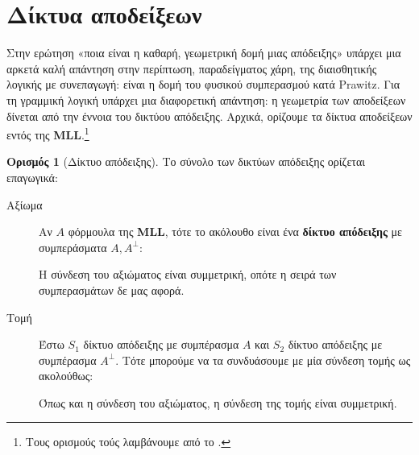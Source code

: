 \documentclass [a4paper,11pt] {book}
\theoremstyle{definition}
\theoremstyle{definition}
\newtheorem{definition}[theorem]{Ορισμός}
\begin{document}
\section{Δίκτυα αποδείξεων}
Στην ερώτηση «ποια είναι η καθαρή, γεωμετρική δομή μιας απόδειξης» υπάρχει μια αρκετά καλή απάντηση στην περίπτωση, παραδείγματος χάρη, της διαισθητικής λογικής με συνεπαγωγή: είναι η δομή του φυσικού συμπερασμού κατά Prawitz. Για τη γραμμική λογική υπάρχει μια διαφορετική απάντηση: η γεωμετρία των αποδείξεων δίνεται από την έννοια του δικτύου απόδειξης. Αρχικά, ορίζουμε τα δίκτυα αποδείξεων εντός της \textbf{MLL}.\footnote{Τους ορισμούς τούς λαμβάνουμε από το \citep{moot2002proof}.}
\begin{definition}[Δίκτυο απόδειξης]
Το σύνολο των δικτύων απόδειξης ορίζεται επαγωγικά:
\begin{description}
\item[Αξίωμα] Αν $A$ φόρμουλα της \textbf{MLL}, τότε το ακόλουθο είναι ένα \textbf{δίκτυο απόδειξης}  με συμπεράσματα $A,A^{\bot}$:
\begin{center}
\end{center}
Η σύνδεση του αξιώματος είναι συμμετρική, οπότε η σειρά των συμπερασμάτων δε μας αφορά.
\item[Τομή] Έστω $S_{1}$ δίκτυο απόδειξης με συμπέρασμα $A$ και $S_{2}$ δίκτυο απόδειξης με συμπέρασμα $A^{\bot}$. Τότε μπορούμε να τα συνδυάσουμε με μία σύνδεση τομής ως ακολούθως:
\begin{center}
\end{center}
Όπως και η σύνδεση του αξιώματος, η σύνδεση της τομής είναι συμμετρική.
\begin{center}
\end{center}
\end{description}
\end{definition}
\end{document}
